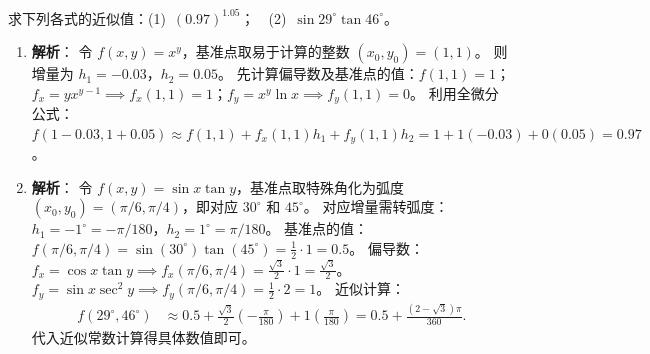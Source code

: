 \documentclass[lang=cn,11pt]{elegantbook}
\begin{document}
\begin{exercise}[全微分近似值计算]
求下列各式的近似值：(1)~$(0.97)^{1.05}$；~~(2)~$\sin29^\circ\tan46^\circ$。
\end{exercise}
\begin{solution}
\begin{enumerate}
  \item[(1)] \textbf{解析}：
  令 $f(x,y) = x^y$，基准点取易于计算的整数 $(x_0,y_0)=(1,1)$。
  则增量为 $h_1 = -0.03$，$h_2 = 0.05$。
  先计算偏导数及基准点的值：$f(1,1)=1$；$f_x = yx^{y-1} \implies f_x(1,1)=1$；$f_y = x^y\ln x \implies f_y(1,1)=0$。
  利用全微分公式：$f(1-0.03, 1+0.05) \approx f(1,1) + f_x(1,1)h_1 + f_y(1,1)h_2 = 1 + 1(-0.03) + 0(0.05) = \boxed{0.97}$。
  
  \item[(2)] \textbf{解析}：
  令 $f(x,y) = \sin x\tan y$，基准点取特殊角化为弧度 $(x_0,y_0)=(\pi/6, \pi/4)$，即对应 $30^\circ$ 和 $45^\circ$。
  对应增量需转弧度：$h_1 = -1^\circ = -\pi/180$，$h_2 = 1^\circ = \pi/180$。
  基准点的值：$f(\pi/6, \pi/4) = \sin(30^\circ)\tan(45^\circ) = \frac{1}{2} \cdot 1 = 0.5$。
  偏导数：$f_x = \cos x\tan y \implies f_x(\pi/6, \pi/4) = \frac{\sqrt{3}}{2} \cdot 1 = \frac{\sqrt{3}}{2}$。
  $f_y = \sin x\sec^2 y \implies f_y(\pi/6, \pi/4) = \frac{1}{2} \cdot 2 = 1$。
  近似计算：
  \begin{align*}
  f(29^\circ, 46^\circ) &\approx 0.5 + \frac{\sqrt{3}}{2}\left(-\frac{\pi}{180}\right) + 1\left(\frac{\pi}{180}\right) = 0.5 + \frac{(2-\sqrt{3})\pi}{360}.
  \end{align*}
  代入近似常数计算得具体数值即可。
\end{enumerate}
\end{solution}
\end{document}
